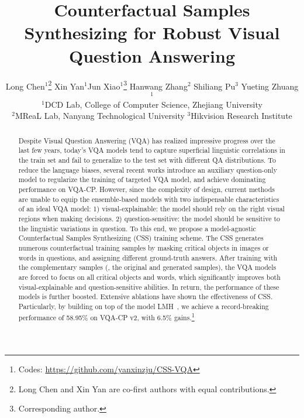 \documentclass[10pt,twocolumn,letterpaper]{article}
\begin{document}
\title{Counterfactual Samples Synthesizing for Robust Visual Question Answering}

\author{Long Chen$^1$\thanks{Long Chen and Xin Yan are co-first authors with equal contributions.} \quad Xin Yan$^1$\footnotemark[1] \quad Jun Xiao$^1$\thanks{Corresponding author.} \quad Hanwang Zhang$^2$ \quad Shiliang Pu$^3$ \quad Yueting Zhuang$^1$ \\
$^1$DCD Lab, College of Computer Science, Zhejiang University \\ $^2$MReaL Lab, Nanyang Technological University \qquad $^3$Hikvision Research Institute \\
}

\maketitle
\thispagestyle{empty}

\begin{abstract}
	Despite Visual Question Answering (VQA) has realized impressive progress over the last few years, today's VQA models tend to capture superficial linguistic correlations in the train set and fail to generalize to the test set with different QA distributions. To reduce the language biases, several recent works introduce an auxiliary question-only model to regularize the training of targeted VQA model, and achieve dominating performance on VQA-CP. However, since the complexity of design, current methods are unable to equip the ensemble-based models with two indispensable characteristics of an ideal VQA model: 1) visual-explainable: the model should rely on the right visual regions when making decisions. 2) question-sensitive: the model should be sensitive to the linguistic variations in question. To this end, we propose a model-agnostic Counterfactual Samples Synthesizing (CSS) training scheme. The CSS generates numerous counterfactual training samples by masking critical objects in images or words in questions, and assigning different ground-truth answers. After training with the complementary samples (\ie, the original and generated samples), the VQA models are forced to focus on all critical objects and words, which significantly improves both visual-explainable and question-sensitive abilities. In return, the performance of these models is further boosted. Extensive ablations have shown the effectiveness of CSS. Particularly, by building on top of the model LMH~\cite{clark2019don}, we achieve a record-breaking performance of 58.95\% on VQA-CP v2, with 6.5\% gains.\footnote{Codes: \href{https://github.com/yanxinzju/CSS-VQA}{https://github.com/yanxinzju/CSS-VQA}}
\end{abstract}
\vspace{-0.5em}
\end{document}
